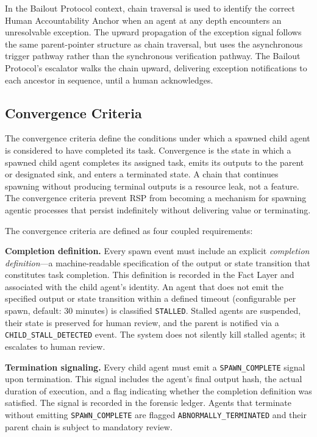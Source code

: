 In the Bailout Protocol context, chain traversal is used to identify the correct Human Accountability Anchor when an agent at any depth encounters an unresolvable exception. The upward propagation of the exception signal follows the same parent-pointer structure as chain traversal, but uses the asynchronous trigger pathway rather than the synchronous verification pathway. The Bailout Protocol's escalator walks the chain upward, delivering exception notifications to each ancestor in sequence, until a human acknowledges.

\subsection{Convergence Criteria}
\label{sec:rsp-convergence}

The convergence criteria define the conditions under which a spawned child agent is considered to have completed its task. Convergence is the state in which a spawned child agent completes its assigned task, emits its outputs to the parent or designated sink, and enters a terminated state. A chain that continues spawning without producing terminal outputs is a resource leak, not a feature. The convergence criteria prevent RSP from becoming a mechanism for spawning agentic processes that persist indefinitely without delivering value or terminating.

The convergence criteria are defined as four coupled requirements:

\textbf{Completion definition.} Every spawn event must include an explicit \textit{completion definition}---a machine-readable specification of the output or state transition that constitutes task completion. This definition is recorded in the Fact Layer and associated with the child agent's identity. An agent that does not emit the specified output or state transition within a defined timeout (configurable per spawn, default: 30 minutes) is classified \texttt{STALLED}. Stalled agents are suspended, their state is preserved for human review, and the parent is notified via a \texttt{CHILD\_STALL\_DETECTED} event. The system does not silently kill stalled agents; it escalates to human review.

\textbf{Termination signaling.} Every child agent must emit a \texttt{SPAWN\_COMPLETE} signal upon termination. This signal includes the agent's final output hash, the actual duration of execution, and a flag indicating whether the completion definition was satisfied. The signal is recorded in the forensic ledger. Agents that terminate without emitting \texttt{SPAWN\_COMPLETE} are flagged \texttt{ABNORMALLY\_TERMINATED} and their parent chain is subject to mandatory review.

